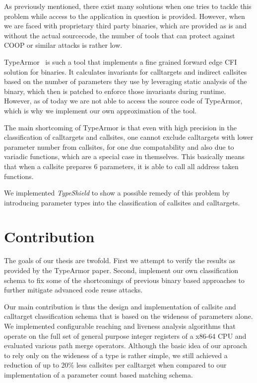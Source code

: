 As previously mentioned, there exist many solutions when one tries to tackle this problem while access to the application in question is provided. However, when we are faced with proprietary third party binaries, which are provided as is and without the actual sourcecode, the number of tools that can protect against COOP or similar attacks is rather low.

TypeArmor~\cite{veen:typearmor} is such a tool that implements a fine grained forward edge CFI solution for binaries. It calculates invariants for calltargets and indirect callsites based on the number of parameters they use by leveraging static analysis of the binary, which then is patched to enforce those invariants during runtime. However, as of today we are not able to access the source code of TypeArmor, which is why we implement our own approximation of the tool.

The main shortcoming of TypeArmor is that even with high precision in the classification of calltargets and callsites, one cannot exclude calltargets with lower parameter number from callsites, for one due compatability and also due to variadic functions, which are a special case in themselves. This basically means that when a callsite prepares 6 parameters, it is able to call all address taken functions.


We implemented \textit{TypeShield} to show a possible remedy of this problem by introducing parameter types into the classification of callsites and calltargets. 

\section{Contribution}
The goals of our thesis are twofold. First we attempt to verify the results as provided by the TypeArmor paper. Second, implement our own classification schema to fix some of the shortcomings of previous binary based approaches to further mitigate advanced code reuse attacks.

Our main contribution is thus the design and implementation of callsite and calltarget classification schema that is based on the wideness of parameters alone. We implemented configurable reaching and liveness analysis algorithms that operate on the full set of general purpose integer registers of a x86-64 CPU and evaluated various path merge operators. Although the basic idea of our aproach to rely only on the wideness of a type is rather simple, we still achieved a reduction of up to 20\% less callsites per calltarget when compared to our implementation of a parameter count based matching schema.


